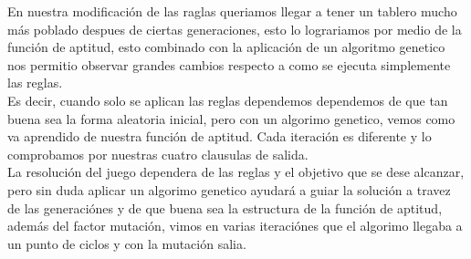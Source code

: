 En nuestra modificación de las raglas queriamos llegar a tener un tablero mucho más poblado 
despues de ciertas generaciones, esto lo lograriamos por medio de la función de aptitud, esto 
combinado con la aplicación de un algoritmo genetico nos permitio observar grandes cambios 
respecto a como se ejecuta simplemente las reglas. \\

Es decir, cuando solo se aplican las reglas dependemos dependemos de que tan buena sea la forma 
aleatoria inicial, pero con un algorimo genetico, vemos como va aprendido de nuestra función de 
aptitud. Cada iteración es diferente y lo comprobamos por nuestras cuatro clausulas de salida.\\

La resolución del juego dependera de las reglas y el objetivo que se dese alcanzar, pero sin 
duda aplicar un algorimo genetico ayudará a guiar la solución a travez de las generaciónes y 
de que buena sea la estructura de la función de aptitud, además del factor mutación, vimos 
en varias iteraciónes que el algorimo llegaba a un punto de ciclos y con la mutación salia. 




